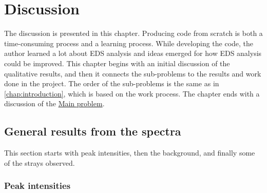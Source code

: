 \chapter{Discussion}
\label{chap:discussion}




The discussion is presented in this chapter.
Producing code from scratch is both a time-consuming process and a learning process.
While developing the code, the author learned a lot about EDS analysis and  ideas emerged for how EDS analysis could be improved.
This chapter begins with an initial discussion of the qualitative results, and then it connects the sub-problems to the results and work done in the project.
The order of the sub-problems is the same as in \cref{chap:introduction}, which is based on the work process.
The chapter ends with a discussion of the \hyperref[mainproblem]{Main problem}.



\section{General results from the spectra}
\label{sec:discussion:general}

This section starts with peak intensities, then the background, and finally some of the strays observed.


\subsection{Peak intensities}
\label{sec:discussion:general:intensities}

